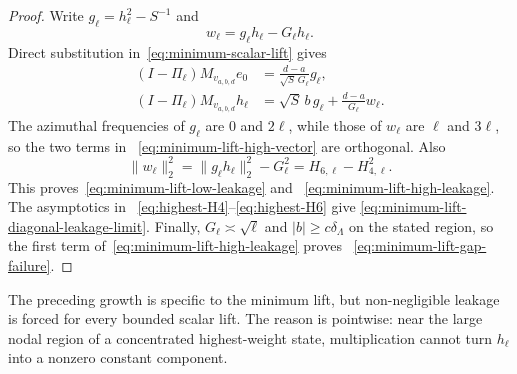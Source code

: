 \documentclass[11pt]{article}
\theoremstyle{definition}
\theoremstyle{remark}
\begin{document}
\begin{proof}
Write $g_\ell=h_\ell^2-S^{-1}$ and
\begin{equation}
 w_\ell=g_\ell h_\ell-G_\ell h_\ell.
\end{equation}
Direct substitution in~\eqref{eq:minimum-scalar-lift} gives
\begin{align}
 (I-\Pi_\ell)M_{v_{a,b,d}}e_0
 &=\frac{d-a}{\sqrt S\,G_\ell}g_\ell,
 \label{eq:minimum-lift-low-vector}\\
 (I-\Pi_\ell)M_{v_{a,b,d}}h_\ell
 &=\sqrt S\,b\,g_\ell+\frac{d-a}{G_\ell}w_\ell.
 \label{eq:minimum-lift-high-vector}
\end{align}
The azimuthal frequencies of $g_\ell$ are $0$ and $2\ell$, while those of
$w_\ell$ are $\ell$ and $3\ell$, so the two terms in
~\eqref{eq:minimum-lift-high-vector} are orthogonal.  Also
\begin{equation}
 \|w_\ell\|_2^2
 =\|g_\ell h_\ell\|_2^2-G_\ell^2
 =H_{6,\ell}-H_{4,\ell}^2.
\end{equation}
This proves~\eqref{eq:minimum-lift-low-leakage} and
~\eqref{eq:minimum-lift-high-leakage}.  The asymptotics in
~\eqref{eq:highest-H4}--\eqref{eq:highest-H6} give
\eqref{eq:minimum-lift-diagonal-leakage-limit}.  Finally,
$G_\ell\asymp\sqrt\ell$ and $|b|\geq c\delta_\Lambda$ on the stated region,
so the first term of~\eqref{eq:minimum-lift-high-leakage} proves
~\eqref{eq:minimum-lift-gap-failure}.
\end{proof}

The preceding growth is specific to the minimum lift, but non-negligible
leakage is forced for every bounded scalar lift.  The reason is pointwise:
near the large nodal region of a concentrated highest-weight state,
multiplication cannot turn $h_\ell$ into a nonzero constant component.
\end{document}
